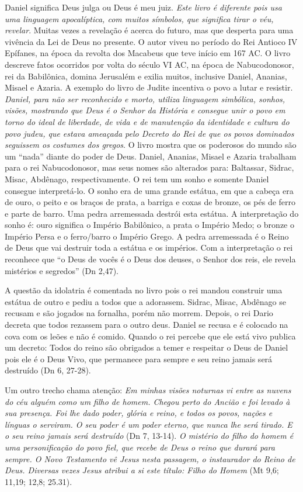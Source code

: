 \documentclass[
]{book}
\begin{document}
Daniel significa Deus julga ou Deus é meu juiz. \emph{Este livro é diferente pois usa uma linguagem apocalíptica, com muitos símbolos, que significa tirar o véu, revelar}. Muitas vezes a revelação é acerca do futuro, mas que desperta para uma vivência da Lei de Deus no presente. O autor viveu no período do Rei Antioco IV Epífanes, na época da revolta dos Macabeus que teve início em 167 AC. O livro descreve fatos ocorridos por volta do século VI AC, na época de Nabucodonosor, rei da Babilônica, domina Jerusalém e exilia muitos, inclusive Daniel, Ananias, Misael e Azaria. A exemplo do livro de Judite incentiva o povo a lutar e resistir. \emph{Daniel, para não ser reconhecido e morto, utiliza linguagem simbólica, sonhos, visões, mostrando que Deus é o Senhor da História e consegue unir o povo em torno do ideal de liberdade, de vida e de manutenção da identidade e cultura do povo judeu, que estava ameaçada pelo Decreto do Rei de que os povos dominados seguissem os costumes dos gregos}. O livro mostra que os poderosos do mundo são um ``nada'' diante do poder de Deus. Daniel, Ananias, Misael e Azaria trabalham para o rei Nabucodonosor, mas seus nomes são alterados para: Baltassar, Sidrac, Misac, Abdênago, respectivamente. O rei tem um sonho e somente Daniel consegue interpretá-lo. O sonho era de uma grande estátua, em que a cabeça era de ouro, o peito e os braços de prata, a barriga e coxas de bronze, os pés de ferro e parte de barro. Uma pedra arremessada destrói esta estátua. A interpretação do sonho é: ouro significa o Império Babilônico, a prata o Império Medo; o bronze o Império Persa e o ferro/barro o Império Grego. A pedra arremessada é o Reino de Deus que vai destruir toda a estátua e os impérios. Com a interpretação o rei reconhece que ``o Deus de vocês é o Deus dos deuses, o Senhor dos reis, ele revela mistérios e segredos'' (Dn 2,47).

A questão da idolatria é comentada no livro pois o rei mandou construir uma estátua de outro e pediu a todos que a adorassem. Sidrac, Misac, Abdênago se recusam e são jogados na fornalha, porém não morrem. Depois, o rei Dario decreta que todos rezassem para o outro deus. Daniel se recusa e é colocado na cova com os leões e não é comido. Quando o rei percebe que ele está vivo publica um decreto: Todos do reino são obrigados a temer e respeitar o Deus de Daniel pois ele é o Deus Vivo, que permanece para sempre e seu reino jamais será destruído (Dn 6, 27-28).

Um outro trecho chama atenção: \emph{Em minhas visões noturnas vi entre as nuvens do céu alguém como um filho de homem. Chegou perto do Ancião e foi levado à sua presença. Foi lhe dado poder, glória e reino, e todos os povos, nações e línguas o serviram. O seu poder é um poder eterno, que nunca lhe será tirado. E o seu reino jamais será destruído} (Dn 7, 13-14). \emph{O mistério do filho do homem é uma personificação do povo fiel, que recebe de Deus o reino que durará para sempre. O Novo Testamento vê Jesus nesta passagem, o instaurador do Reino de Deus. Diversas vezes Jesus atribui a si este título: Filho do Homem} (Mt 9,6; 11,19; 12,8; 25.31).
\end{document}
